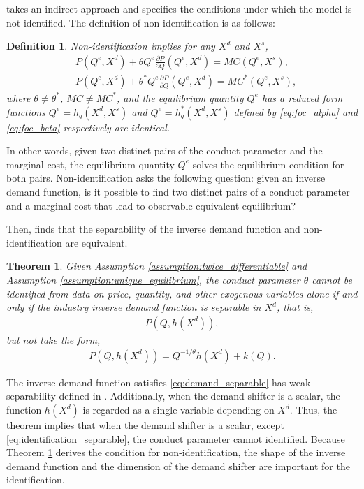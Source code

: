 \documentclass[11pt, a4paper]{article}
\newtheorem{theorem}{Theorem}
\newtheorem{definition}{Definition}
\theoremstyle{remark}
\begin{document}
\citet{lau1982identifying} takes an indirect approach and specifies the conditions under which the model is not identified.
The definition of non-identification is as follows:
\begin{definition}\label{def:non_identification}
    Non-identification implies for any $X^{d}$ and $X^{s}$,
    \begin{align}
    & P(Q^e, X^{d}) + \theta Q^e\frac{\partial P}{\partial Q}(Q^e, X^{d}) = MC(Q^e, X^{s}) ,  \label{eq:foc_alpha}\\
    & P(Q^e, X^{d}) + \theta^{*} Q^e\frac{\partial P}{\partial Q}(Q^e, X^{d}) = MC^{*}(Q^e, X^{s}),\label{eq:foc_beta}
    \end{align}
    where $\theta \neq \theta^{*}$, $MC \ne MC^{*}$, and the equilibrium quantity $Q^e$ has a reduced form functions $Q^e = h_q(X^{d}, X^{s})$ and $Q^e = h_q^{*}(X^{d}, X^{s})$ defined by \eqref{eq:foc_alpha} and \eqref{eq:foc_beta} respectively are identical.
\end{definition}
In other words, given two distinct pairs of the conduct parameter and the marginal cost, the equilibrium quantity $Q^e$ solves the equilibrium condition for both pairs.
Non-identification asks the following question: given an inverse demand function, is it possible to find two distinct pairs of a conduct parameter and a marginal cost that lead to observable equivalent equilibrium?

Then, \citet{lau1982identifying} finds that the separability of the inverse demand function and non-identification are equivalent.
\begin{theorem}\label{theorem_lau}
    Given Assumption \ref{assumption:twice_differentiable} and Assumption \ref{assumption:unique_equilibrium},
    the conduct parameter $\theta$ cannot be identified from data on price, quantity, and other exogenous variables alone if and only if the industry inverse demand function is separable in $X^{d}$, that is,
    \begin{align}
        P(Q, h(X^{d})), \label{eq:demand_separable}
    \end{align}
    but not take the form, 
    \begin{align}
        P(Q, h(X^{d})) = Q^{-1/\theta}h(X^{d}) + k(Q). \label{eq:identification_separable}
    \end{align}
\end{theorem}
The inverse demand function satisfies \eqref{eq:demand_separable} has weak separability defined in \citet{goldmanNote1964}.
Additionally, when the demand shifter is a scalar, the function $h(X^{d})$ is regarded as a single variable depending on $X^{d}$.
Thus, the theorem implies that when the demand shifter is a scalar, except \eqref{eq:identification_separable}, the conduct parameter cannot identified.
Because Theorem \ref{theorem_lau} derives the condition for non-identification, the shape of the inverse demand function and the dimension of the demand shifter are important for the identification.
\end{document}
